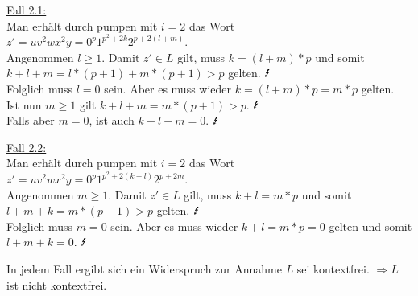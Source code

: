 \begin{teile}
	\underline{Fall 2.1:}\\
	Man erhält durch pumpen mit $i = 2$ das Wort $z'=uv^2wx^2y=0^{p}1^{p^2+2k}2^{p+2(l+m)}$.\\
	Angenommen $l\geq 1$. Damit $z' \in L$ gilt, muss $k = (l+m)*p$ und somit $k+l+m=l*(p+1)+m*(p+1)>p$ gelten. $\mbox{\Lightning}$\\
	Folglich muss $l=0$ sein. Aber es muss wieder $k = (l+m)*p = m*p$ gelten.\\
	Ist nun $m\geq 1$ gilt $k+l+m=m*(p+1)>p$. $\mbox{\Lightning}$\\
	Falls aber $m=0$, ist auch $k+l+m=0$. $\mbox{\Lightning}$

	\underline{Fall 2.2:}\\
	Man erhält durch pumpen mit $i = 2$ das Wort $z'=uv^2wx^2y=0^{p}1^{p^2+2(k+l)}2^{p+2m}$.\\
	Angenommen $m\geq 1$. Damit $z' \in L$ gilt, muss $k+l = m*p$ und somit $l+m+k=m*(p+1)>p$ gelten. $\mbox{\Lightning}$\\
	Folglich muss $m=0$ sein. Aber es muss wieder $k+l = m*p = 0$ gelten und somit $l+m+k=0$. $\mbox{\Lightning}$

	In jedem Fall ergibt sich ein Widerspruch zur Annahme $L$ sei kontextfrei. $\Rightarrow L$ ist nicht kontextfrei.
		
\end{teile}

\newpage
